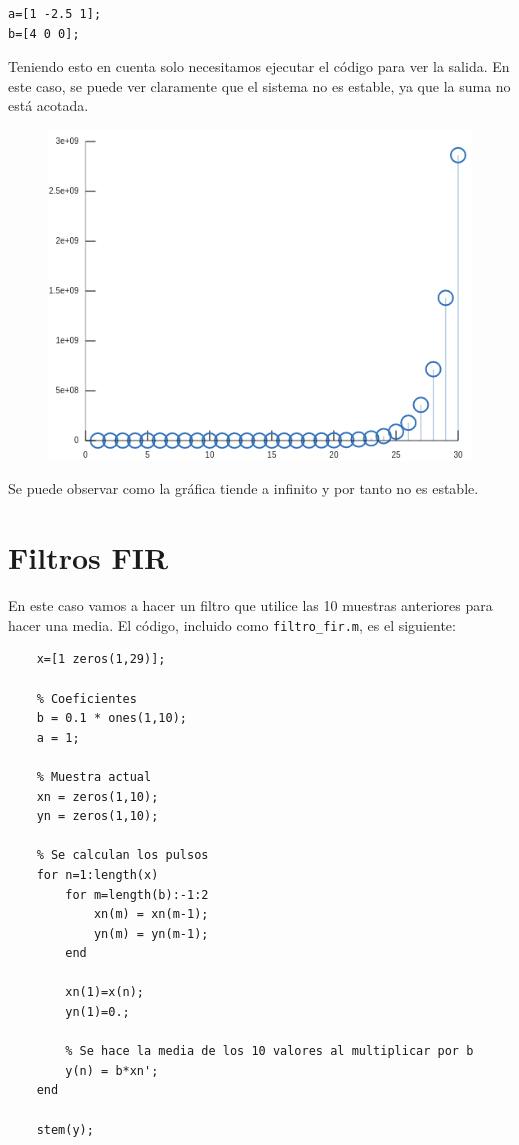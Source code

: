 \documentclass[11pt,a4paper]{article}
\begin{document}
\begin{lstlisting}[frame=single]
 % Se definen los coeficientes de las ecuaciones en diferencias
a=[1 -2.5 1];
b=[4 0 0];
\end{lstlisting}

Teniendo esto en cuenta solo necesitamos ejecutar el código para ver la salida. En este caso, se puede ver claramente que el sistema no es estable, ya que la suma no está acotada.

\begin{figure}[H]
	\centering
	\includegraphics[scale=0.5]{img/iir-inestable.png}
\end{figure}

Se puede observar como la gráfica tiende a infinito y por tanto no es estable.
	
\newpage
	
\section{Filtros FIR}

En este caso vamos a hacer un filtro que utilice las 10 muestras anteriores para hacer una media. El código, incluido como \texttt{filtro\_fir.m}, es el siguiente:

\begin{lstlisting}[frame=single]
	% Se define el array con los pulsos
	x=[1 zeros(1,29)];

	% Coeficientes
	b = 0.1 * ones(1,10);
	a = 1;

	% Muestra actual
	xn = zeros(1,10);
	yn = zeros(1,10);

	% Se calculan los pulsos
	for n=1:length(x)
		for m=length(b):-1:2
			xn(m) = xn(m-1);
			yn(m) = yn(m-1);
		end

		xn(1)=x(n);
		yn(1)=0.;

		% Se hace la media de los 10 valores al multiplicar por b
		y(n) = b*xn';
	end

	stem(y);
\end{lstlisting}
\end{document}
